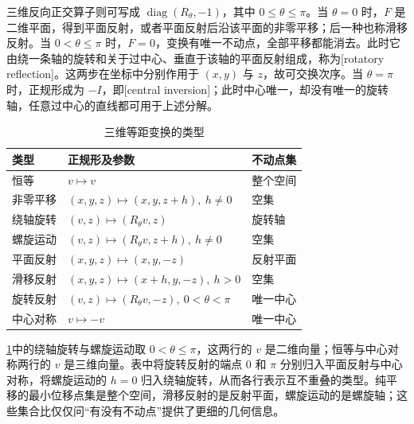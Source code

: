 \ProseParagraphBreak

三维反向正交算子则可写成 \(\operatorname{diag}(R_\theta,-1)\)，其中 \(0\leq\theta\leq\pi\)。当 \(\theta=0\) 时，\(F\) 是二维平面，得到平面反射，或者平面反射后沿该平面的非零平移；后一种也称滑移反射。当 \(0<\theta\leq\pi\) 时，\(F=0\)，变换有唯一不动点，全部平移都能消去。此时它由绕一条轴的旋转和关于过中心、垂直于该轴的平面反射组成，称为[rotatory reflection]。这两步在坐标中分别作用于 \((x,y)\) 与 \(z\)，故可交换次序。当 \(\theta=\pi\) 时，正规形成为 \(-I\)，即[central inversion]；此时中心唯一，却没有唯一的旋转轴，任意过中心的直线都可用于上述分解。

\begin{table}[htbp]
	\centering
	\caption{三维等距变换的类型}
	\label{g1:tab:space-isometries}
	\begin{tabularx}{\linewidth}{@{}l l X@{}}
		\toprule
		类型 & 正规形及参数 & 不动点集 \\
		\midrule
		恒等 & \(v\mapsto v\) & 整个空间 \\
		非零平移 & \((x,y,z)\mapsto(x,y,z+h),\ h\ne0\) & 空集 \\
		绕轴旋转 & \((v,z)\mapsto(R_\theta v,z)\) & 旋转轴 \\
		螺旋运动 & \((v,z)\mapsto(R_\theta v,z+h),\ h\ne0\) & 空集 \\
		平面反射 & \((x,y,z)\mapsto(x,y,-z)\) & 反射平面 \\
		滑移反射 & \((x,y,z)\mapsto(x+h,y,-z),\ h>0\) & 空集 \\
		旋转反射 & \((v,z)\mapsto(R_\theta v,-z),\ 0<\theta<\pi\) & 唯一中心 \\
		中心对称 & \(v\mapsto-v\) & 唯一中心 \\
		\bottomrule
	\end{tabularx}
\end{table}

\cref{g1:tab:space-isometries}中的绕轴旋转与螺旋运动取 \(0<\theta\leq\pi\)，这两行的 \(v\) 是二维向量；恒等与中心对称两行的 \(v\) 是三维向量。表中将旋转反射的端点 \(0\) 和 \(\pi\) 分别归入平面反射与中心对称，将螺旋运动的 \(h=0\) 归入绕轴旋转，从而各行表示互不重叠的类型。纯平移的最小位移点集是整个空间，滑移反射的是反射平面，螺旋运动的是螺旋轴；这些集合比仅仅问“有没有不动点”提供了更细的几何信息。
